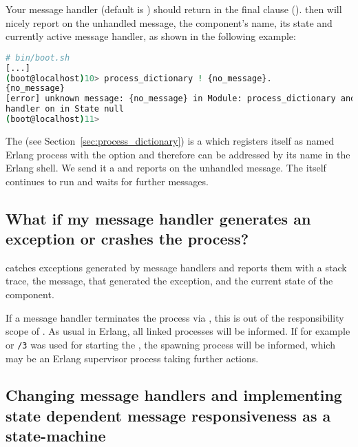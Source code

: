 Your message handler (default is )
should return  in the final clause
().   then
will nicely report on the unhandled message, the component's name, its state
and currently active message handler, as shown in the following example:

\begin{lstlisting}[language=bash]
# bin/boot.sh
[...]
(boot@localhost)10> process_dictionary ! {no_message}.
{no_message}
[error] unknown message: {no_message} in Module: process_dictionary and
handler on in State null
(boot@localhost)11>
\end{lstlisting}

The  (see
Section~\ref{sec:process_dictionary}) is a  which
registers itself as named Erlang process with the 
option  and therefore can be addressed by its name in
the Erlang shell. We send it a  and
 reports on the unhandled message. The
 itself continues to run and waits for
further messages.

\subsection{What if my message handler generates an exception or
 crashes the process?}

 catches exceptions generated by message handlers
and reports them with a stack trace, the message, that generated the
exception, and the current state of the component.

If a message handler terminates the process via ,
this is out of the responsibility scope of . As
usual in Erlang, all linked processes will be informed. If for example
 or \texttt{/3} was used for
starting the , the spawning process will be
informed, which may be an Erlang supervisor process taking further actions.

\subsection{Changing message handlers and implementing state dependent
 message responsiveness as a state-machine}
\label{sec:gen_component:change_handler}

